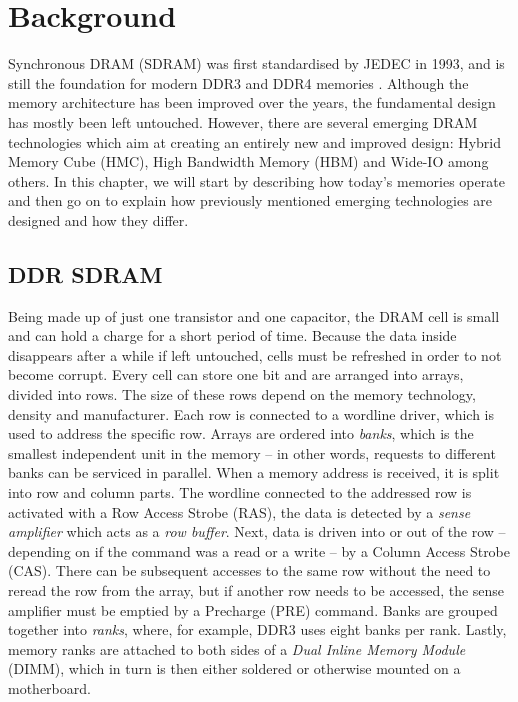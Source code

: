 \chapter{Background}
Synchronous DRAM (SDRAM) was first standardised by JEDEC in 1993, and is still the foundation for modern DDR3 and DDR4 memories \cite{standard2008double}. Although the memory architecture has been improved over the years, the fundamental design has mostly been left untouched. However, there are several emerging DRAM technologies which aim at creating an entirely new and improved design: Hybrid Memory Cube (HMC), High Bandwidth Memory (HBM) and Wide-IO among others. In this chapter, we will start by describing how today's memories operate and then go on to explain how previously mentioned emerging technologies are designed and how they differ. 

\section{DDR SDRAM}
Being made up of just one transistor and one capacitor, the DRAM cell is small and can hold a charge for a short period of time. Because the data inside disappears after a while if left untouched, cells must be refreshed in order to not become corrupt. Every cell can store one bit and are arranged into arrays, divided into rows. The size of these rows depend on the memory technology, density and manufacturer. Each row is connected to a wordline driver, which is used to address the specific row. Arrays are ordered into \emph{banks}, which is the smallest independent unit in the memory -- in other words, requests to different banks can be serviced in parallel. When a memory address is received, it is split into row and column parts. The wordline connected to the addressed row is activated with a Row Access Strobe (RAS), the data is detected by a \emph{sense amplifier} which acts as a \emph{row buffer}. Next, data is driven into or out of the row -- depending on if the command was a read or a write -- by a Column Access Strobe (CAS). There can be subsequent accesses to the same row without the need to reread the row from the array, but if another row needs to be accessed, the sense amplifier must be emptied by a Precharge (PRE) command. Banks are grouped together into \emph{ranks}, where, for example, DDR3 uses eight banks per rank. Lastly, memory ranks are attached to both sides of a \emph{Dual Inline Memory Module} (DIMM), which in turn is then either soldered or otherwise mounted on a motherboard. 
\bigskip

